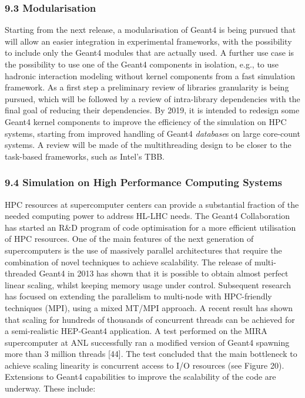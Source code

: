 \documentclass[12pt,a4paper]{article}
\begin{document}
\hypertarget{modularisation}{%
\subsubsection{9.3 Modularisation}\label{modularisation}}

Starting from the next release, a modularisation of Geant4 is being
pursued that will allow an easier integration in experimental
frameworks, with the possibility to include only the Geant4 modules that
are actually used. A further use case is the possibility to use one of
the Geant4 components in isolation, e.g., to use hadronic interaction
modeling without kernel components from a fast simulation framework. As
a first step a preliminary review of libraries granularity is being
pursued, which will be followed by a review of intra-library
dependencies with the final goal of reducing their dependencies. By
2019, it is intended to redesign some Geant4 kernel components to
improve the efficiency of the simulation on HPC systems, starting from
improved handling of Geant4 \emph{database}s on large core-count
systems. A review will be made of the multithreading design to be closer
to the task-based frameworks, such as Intel's TBB.

\hypertarget{simulation-on-high-performance-computing-systems}{%
\subsubsection{9.4 Simulation on High Performance Computing
Systems}\label{simulation-on-high-performance-computing-systems}}

HPC resources at supercomputer centers can provide a substantial
fraction of the needed computing power to address HL-LHC needs. The
Geant4 Collaboration has started an R\&D program of code optimisation
for a more efficient utilisation of HPC resources. One of the main
features of the next generation of supercomputers is the use of
massively parallel architectures that require the combination of novel
techniques to achieve scalability. The release of multi-threaded Geant4
in 2013 has shown that it is possible to obtain almost perfect linear
scaling, whilst keeping memory usage under control. Subsequent research
has focused on extending the parallelism to multi-node with HPC-friendly
techniques (MPI), using a mixed MT/MPI approach. A recent result has
shown that scaling for hundreds of thousands of concurrent threads can
be achieved for a semi-realistic HEP-Geant4 application. A test
performed on the MIRA supercomputer at ANL successfully ran a modified
version of Geant4 spawning more than 3 million threads {[}44{]}. The
test concluded that the main bottleneck to achieve scaling linearity is
concurrent access to I/O resources (see Figure 20). Extensions to Geant4
capabilities to improve the scalability of the code are underway. These
include:
\end{document}
